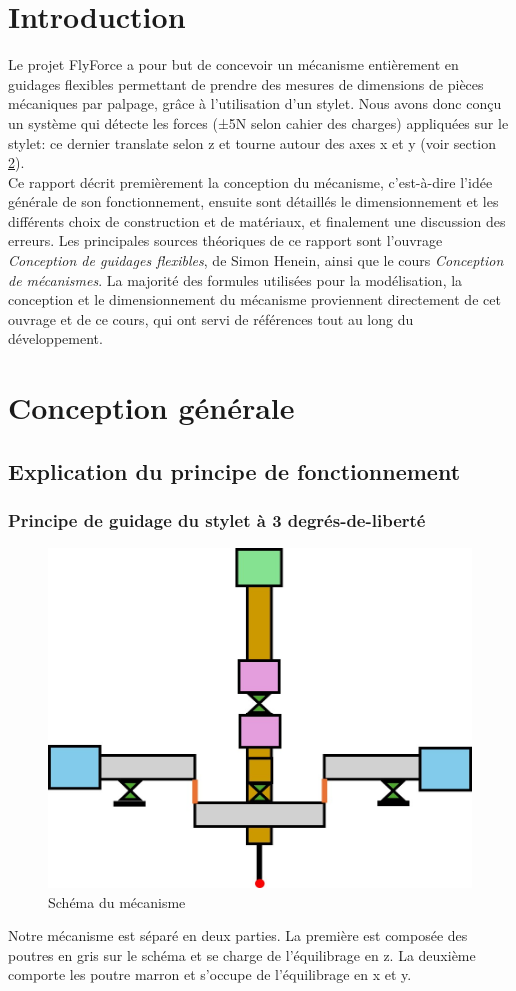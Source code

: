 \documentclass[a4paper, 11pt]{article} %
\begin{document}

\begingroup
\let\clearpage\relax %
\scriptsize

\tableofcontents
\endgroup
\newpage
\section{Introduction}
Le projet FlyForce a pour but de concevoir un mécanisme entièrement en guidages flexibles permettant de prendre des mesures de dimensions de pièces mécaniques par palpage, grâce à l'utilisation d'un stylet. Nous avons donc conçu un système qui détecte les forces (±5N selon cahier des charges) appliquées sur le stylet: ce dernier translate selon z et tourne autour des axes x et y (voir section \ref{conceptionito}).
\\Ce rapport décrit premièrement la conception du mécanisme, c'est-à-dire l'idée générale de son fonctionnement, ensuite sont détaillés le dimensionnement et les différents choix de construction et de matériaux, et finalement une discussion des erreurs. Les principales sources théoriques de ce rapport sont l’ouvrage \textit{Conception de guidages flexibles}, de Simon Henein, ainsi que le cours \textit{Conception de mécanismes}. La majorité des formules utilisées pour la modélisation, la conception et le dimensionnement du mécanisme proviennent directement de cet ouvrage et de ce cours, qui ont servi de références tout au long du développement. 

\section{Conception générale}
\label{conceptionito}
\subsection{Explication du principe de fonctionnement}
\subsubsection{Principe de guidage du stylet à 3 degrés-de-liberté}

\begin{figure}[H]
    \centering
    \includegraphics[width=0.35\linewidth]{images/flyforce_neutral.jpg} 
    \caption{Schéma du mécanisme }  
    \label{fig:mouvement_neutre}
\end{figure}
Notre mécanisme est séparé en deux parties. La première est composée des poutres en gris sur le schéma et se charge de l'équilibrage en z. La deuxième comporte les poutre marron et s'occupe de l'équilibrage en x et y.
\end{document}

